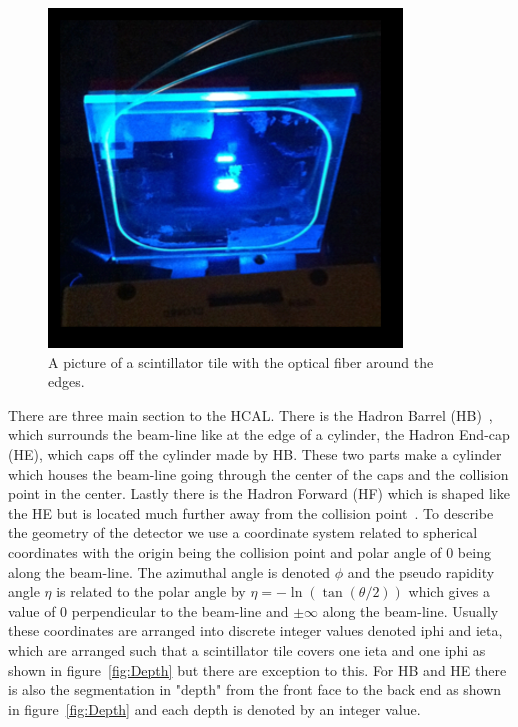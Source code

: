 \begin{figure}
\centering
\includegraphics[width=0.6\linewidth]{Figures/Tile.png}
\caption{A picture of a scintillator tile with the optical fiber around the edges.}
\label{fig:Tile}
\end{figure}


There are three main section to the HCAL. There is the Hadron Barrel (HB)~\cite{HB}, which surrounds the beam-line like at the edge of a cylinder, the Hadron End-cap (HE), which caps off the cylinder made by HB. These two parts make a cylinder which houses the beam-line going through the center of the caps and the collision point in the center. Lastly there is the Hadron Forward (HF) which is shaped like the HE but is located much further away from the collision point~\cite{HF}. To describe the geometry of the detector we use a coordinate system related to spherical coordinates with the origin being the collision point and polar angle of 0 being along the beam-line. The azimuthal angle is denoted $\phi$ and the pseudo rapidity angle $\eta$ is related to the polar angle by $\eta = -\ln(\tan(\theta/2))$ which gives a value of 0 perpendicular to the beam-line and $\pm\infty$ along the beam-line. Usually these coordinates are arranged into discrete integer values denoted iphi and ieta, which are arranged such that a scintillator tile covers one ieta and one iphi as shown in figure~\ref{fig:Depth} but there are exception to this. For HB and HE there is also the segmentation in "depth" from the front face to the back end as shown in figure~\ref{fig:Depth} and each depth is denoted by an integer value. 



